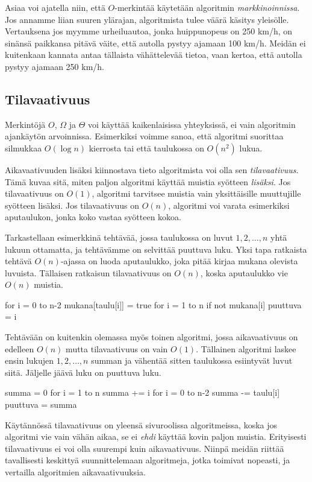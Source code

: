 Asiaa voi ajatella niin, että $O$-merkintää käytetään algoritmin
\emph{markkinoinnissa}. Jos annamme liian suuren ylärajan, algoritmista
tulee väärä käsitys yleisölle.
Vertauksena jos myymme urheiluautoa, jonka huippunopeus on 250 km/h,
on sinänsä paikkansa pitävä väite, että autolla pystyy ajamaan 100 km/h.
Meidän ei kuitenkaan kannata antaa tällaista vähättelevää tietoa,
vaan kertoa, että autolla pystyy ajamaan 250 km/h.

\subsection{Tilavaativuus}

Merkintöjä $O$, $\Omega$ ja $\Theta$ voi käyttää
kaikenlaisissa yhteyksissä, ei vain algoritmin ajankäytön arvoinnissa.
Esimerkiksi voimme sanoa, että algoritmi suorittaa silmukkaa $O(\log n)$ kierrosta
tai että taulukossa on $O(n^2)$ lukua.

Aikavaativuuden lisäksi kiinnostava tieto algoritmista voi olla sen
\emph{tilavaativuus}. Tämä kuvaa sitä, miten paljon algoritmi
käyttää muistia syötteen \emph{lisäksi}.
Jos tilavaativuus on $O(1)$, algoritmi tarvitsee muistia
vain yksittäisille muuttujille syötteen lisäksi.
Jos tilavaativuus on $O(n)$, algoritmi voi varata esimerkiksi aputaulukon,
jonka koko vastaa syötteen kokoa.

Tarkastellaan esimerkkinä tehtävää, jossa taulukossa on
luvut $1,2,\dots,n$ yhtä lukuun ottamatta,
ja tehtävämme on selvittää puuttuva luku.
Yksi tapa ratkaista tehtävä $O(n)$-ajassa on luoda aputaulukko,
joka pitää kirjaa mukana olevista luvuista.
Tällaisen ratkaisun tilavaativuus on $O(n)$,
koska aputaulukko vie $O(n)$ muistia.

\begin{code}
for i = 0 to n-2
    mukana[taulu[i]] = true
for i = 1 to n
    if not mukana[i]
        puuttuva = i
\end{code}

Tehtävään on kuitenkin olemassa myös toinen algoritmi,
jossa aikavaativuus on edelleen $O(n)$ mutta tilavaativuus on vain $O(1)$.
Tällainen algoritmi laskee ensin lukujen $1,2,\dots,n$ summan
ja vähentää sitten taulukossa esiintyvät luvut siitä.
Jäljelle jäävä luku on puuttuva luku.

\begin{code}
summa = 0
for i = 1 to n
    summa += i
for i = 0 to n-2
    summa -= taulu[i]
puuttuva = summa
\end{code}

Käytännössä tilavaativuus on yleensä sivuroolissa algoritmeissa,
koska jos algoritmi vie vain vähän aikaa, se ei \emph{ehdi} käyttää kovin paljon muistia.
Erityisesti tilavaativuus ei voi olla suurempi kuin aikavaativuus.
Niinpä meidän riittää tavallisesti keskittyä suunnittelemaan algoritmeja,
jotka toimivat nopeasti, ja vertailla algoritmien aikavaativuuksia.

